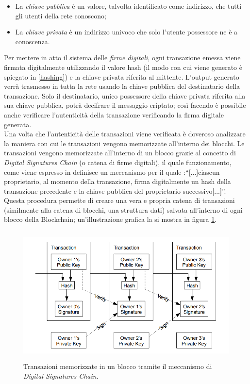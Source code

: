 \begin{itemize}
    \item La \textit{chiave pubblica} è un valore, talvolta identificato come indirizzo, che tutti gli utenti della rete conoscono;
    \item La \textit{chiave privata} è un indirizzo univoco che solo l'utente possessore ne è a conoscenza.
\end{itemize}

Per mettere in atto il sistema delle \textit{firme digitali}, ogni transazione emessa viene firmata digitalmente utilizzando il valore hash (il modo con cui viene generato è spiegato in \ref{hashing}) e la chiave privata riferita al mittente.
L'output generato verrà trasmesso in tutta la rete usando la chiave pubblica del destinatario della transazione. Solo il destinatario, unico possessore della chiave privata riferita alla sua chiave pubblica, potrà decifrare il messaggio criptato;  così facendo è possibile anche verificare l'autenticità della transazione verificando la firma digitale generata. \\
Una volta che l'autenticità delle transazioni viene verificata è doveroso analizzare la maniera con cui le transazioni vengono memorizzate all'interno dei blocchi.
Le transazioni vengono memorizzate all'interno di un blocco grazie al concetto di \textit{Digital Signatures Chain} (o catena di firme digitali), il quale funzionamento, come viene espresso in \cite{bitcoin} definisce un meccanismo per il quale :“[...]ciascun proprietario, al momento della transazione, firma digitalmente un hash della transazione precedente e la chiave pubblica del proprietario successivo[...]”. 
Questa procedura permette di creare una vera e propria catena di transazioni (similmente alla catena di blocchi, una struttura dati) salvata all'interno di ogni blocco della Blockchain; un'illustrazione grafica la si mostra in figura \ref{transaction_chain}.\\
\begin{figure}[h]
    \centering
    \includegraphics[width=12cm,height=7cm]{Immagini/Transaction_Chain.png}
    \caption[Transaction Chain]{Transazioni memorizzate in un blocco tramite il meccanismo di \textit{Digital Signatures Chain}.}
    \label{transaction_chain}
\end{figure}
